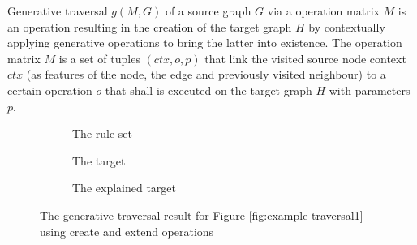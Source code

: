 \begin{definition}\label{def:generative-traversal}
    Generative traversal $g(M,G)$ of a source graph $G$ via a operation matrix $M$ is an operation resulting in the creation of the target graph $H$ by contextually applying generative operations to bring the latter into existence. The operation matrix $M$ is a set of tuples $(ctx,o,p)$ that link the visited source node context $ctx$ (as features of the node, the edge and previously visited neighbour) to a certain operation $o$ that shall is executed on the target graph $H$ with parameters $p$.
\end{definition}


\begin{figure}[!ht]
    \centering
    \begin{subfigure}[t]{0.28\textwidth}
        \centering
        \caption{The rule set}
        \label{fig:example-traversal00}
    \end{subfigure}
    \begin{subfigure}[t]{0.3\textwidth}
        \centering
        \caption{The target}
        \label{fig:example-traversal21}
    \end{subfigure}
    \begin{subfigure}[t]{0.4\textwidth}
        \centering
        \caption{The explained target}
        \label{fig:example-traversal22}
    \end{subfigure} 
    \caption{The generative traversal result for Figure \ref{fig:example-traversal1} using create and extend operations}
    \label{fig:example-traversal2}
\end{figure}

